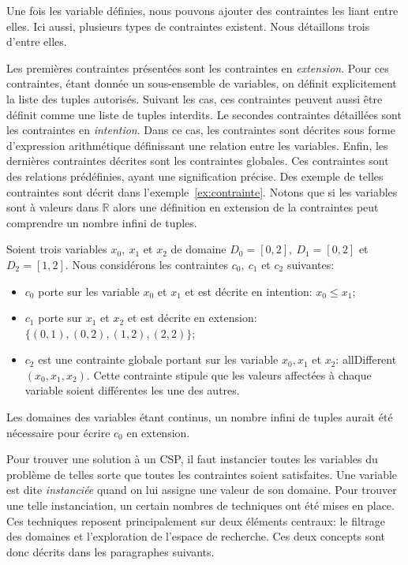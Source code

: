 Une fois les variable définies, nous pouvons ajouter des contraintes
les liant entre elles. Ici aussi, plusieurs types de contraintes
existent. Nous détaillons trois d'entre elles. 

Les premières contraintes présentées sont les contraintes en {\it
  extension}. Pour ces contraintes, étant donnée un sous-ensemble de
variables, on définit explicitement la liste des tuples
autorisés. Suivant les cas, ces contraintes peuvent aussi être définit
comme une liste de tuples interdits. Le secondes contraintes
détaillées sont les contraintes en {\it intention}. Dans ce cas, les
contraintes sont décrites sous forme d'expression arithmétique
définissant  une relation entre les variables. Enfin, les dernières
contraintes décrites sont les contraintes globales. Ces contraintes
sont des relations prédéfinies, ayant une signification précise. Des
exemple de telles contraintes sont décrit dans
l'exemple~\ref{ex:contrainte}. Notons que si les variables sont à
valeurs dans $\mathbb{R}$ alors une définition en extension de la
contraintes peut comprendre un nombre infini de tuples.

\begin{ex}
\label{ex:contrainte}
  Soient trois variables $x_0,\ x_1$ et $x_2$ de domaine $D_0=[0,2],\
  D_1=[0,2]$ et $D_2=[1,2]$. 
  Nous considérons les contraintes $c_0,\ c_1$ et $c_2$ suivantes:
  \begin{itemize}
  \item $c_0$ porte sur les variable $x_0$ et $x_1$ et est décrite en
    intention: $x_0 \le x_1$; 
  \item $c_1$ porte sur $x_1$ et $x_2$ et est décrite en extension:
    $\{(0,1) , (0,2), (1,2), (2,2)\}$; 
  \item $c_2$ est une contrainte  globale portant sur les variable
    $x_0,x_1$ et $x_2$: allDifferent$(x_0,x_1,x_2)$. Cette contrainte
    stipule que les valeurs affectées à chaque variable soient
    différentes les une des autres. 
  \end{itemize}
  Les domaines des variables étant continus, un nombre infini de
tuples aurait été nécessaire pour écrire $c_0$ en extension.
\end{ex}

Pour trouver une solution à un CSP, il faut instancier toutes les
variables du problème de telles sorte que toutes les contraintes
soient satisfaites. Une variable est dite {\it instanciée} quand on
lui assigne une valeur de son domaine. Pour trouver une telle
instanciation, un certain nombres de techniques ont été mises en
place. Ces techniques reposent principalement sur deux éléments
centraux: le filtrage des domaines et l'exploration de l'espace de
recherche. Ces deux concepts sont donc décrits dans les paragraphes
suivants.



